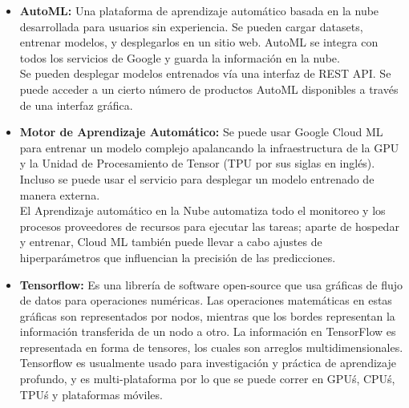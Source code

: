 \documentclass[12pt, a4paper, titlepage]{report}
\begin{document}
		\begin{itemize}
			\item \textbf{AutoML:} Una plataforma de aprendizaje automático basada en la nube desarrollada para usuarios sin experiencia. Se pueden cargar datasets, entrenar modelos, y desplegarlos en un sitio web. AutoML se integra con todos los servicios de Google y guarda la información en la nube.\\
			Se pueden desplegar modelos entrenados vía una interfaz de REST API. Se puede acceder a un cierto número de productos AutoML disponibles a través de una interfaz gráfica.
			\item \textbf{Motor de Aprendizaje Automático:} Se puede usar Google Cloud ML para entrenar un modelo complejo apalancando la infraestructura de la GPU y la Unidad de Procesamiento de Tensor (TPU por sus siglas en inglés). Incluso se puede usar el servicio para desplegar un modelo entrenado de manera externa.\\
			El Aprendizaje automático en la Nube automatiza todo el monitoreo y los procesos proveedores de recursos para ejecutar las tareas;  aparte de hospedar y entrenar, Cloud ML también puede llevar a cabo ajustes de hiperparámetros que influencian la precisión de las predicciones.
			\item \textbf{Tensorflow:} Es una librería de software open-source que usa gráficas de flujo de datos para operaciones numéricas. Las operaciones matemáticas en estas gráficas son representados por nodos, mientras que los bordes representan la información transferida de un nodo a otro. La información en TensorFlow es representada en forma de tensores, los cuales son arreglos multidimensionales.\\ Tensorflow es usualmente usado para investigación y práctica de aprendizaje profundo, y es multi-plataforma por lo que se puede correr en GPU\'s, CPU\'s, TPU\'s y plataformas móviles.
		\end{itemize}
		
\end{document}
